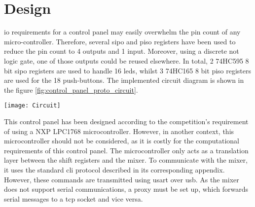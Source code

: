 \documentclass[../main.tex]{subfiles}
\begin{document}
\section{Design}
\Gls{io} requirements for a control panel may easily overwhelm the pin count of any micro-controller. Therefore, several \gls{sipo} and \gls{piso} registers have been used to reduce the pin count to 4 outputs and 1 input. Moreover, using a discrete not logic gate, one of those outputs could be reused elsewhere. In total, 2 74HC595 8 bit \gls{sipo} registers are used to handle 16 \glspl{led}, whilst 3 74HC165 8 bit \gls{piso} registers are used for the 18 push-buttons. The implemented circuit diagram is shown in the figure \ref{fig:control_panel_proto_circuit}.\newline

\begin{sidewaysfigure}[hbtp]
    \centering
    \texttt{[image: Circuit]}

    \caption{Digital circuit blueprints for the control panel prototype}
    \label{fig:control_panel_proto_circuit}
\end{sidewaysfigure}


This control panel has been designed according to the competition's requirement of using a NXP LPC1768 microcontroller. However, in another context, this microcontroller should not be considered, as it is costly for the computational requirements of this control panel. The microcontroller only acts as a translation layer between the shift registers and the mixer. To communicate with the mixer, it uses the standard \gls{cli} protocol described in its corresponding appendix. However, these commands are transmitted using \gls{usart} over \gls{usb}. As the mixer does not support serial communications, a proxy must be set up, which forwards serial messages to a \gls{tcp} socket and vice versa.
\end{document}

